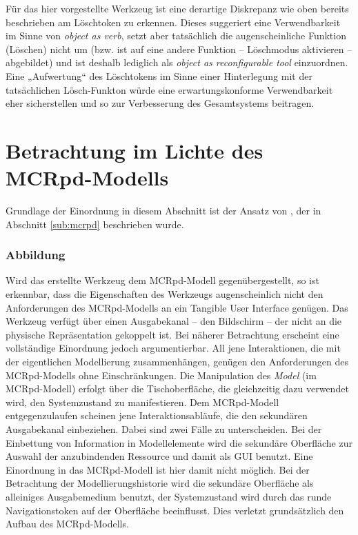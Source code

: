 Für das hier vorgestellte Werkzeug ist eine derartige Diskrepanz wie oben bereits beschrieben am Löschtoken zu erkennen. Dieses suggeriert eine Verwendbarkeit im Sinne von \emph{object as verb}, setzt aber tatsächlich die augenscheinliche Funktion (Löschen) nicht um (bzw. ist auf eine andere Funktion -- Löschmodus aktivieren -- abgebildet) und ist deshalb lediglich als \emph{object as reconfigurable tool} einzuordnen. Eine „Aufwertung“ des Löschtokens im Sinne einer Hinterlegung mit der tatsächlichen Lösch-Funkton würde eine erwartungskonforme Verwendbarkeit eher sicherstellen und so zur Verbesserung des Gesamtsystems beitragen.


\section{Betrachtung im Lichte des MCRpd-Modells} %
\label{sec:betrachtung_im_lichte_des_mcrpd_modells}

Grundlage der Einordnung in diesem Abschnitt ist der Ansatz von \citet{Ullmer00}, der in Abschnitt \ref{sub:mcrpd} beschrieben wurde.

\subsubsection{Abbildung}

Wird das erstellte Werkzeug dem \gls{MCRpd}-Modell gegenübergestellt, so ist erkennbar, dass die Eigenschaften des Werkzeugs augenscheinlich nicht den Anforderungen des \gls{MCRpd}-Modells an ein Tangible User Interface genügen. Das Werkzeug verfügt über einen Ausgabekanal -- den Bildschirm -- der nicht an die physische Repräsentation gekoppelt ist. Bei näherer Betrachtung erscheint eine vollständige Einordnung jedoch argumentierbar. All jene Interaktionen, die mit der eigentlichen Modellierung zusammenhängen, genügen den Anforderungen des \gls{MCRpd}-Modells ohne Einschränkungen. Die Manipulation des \emph{Model} (im \gls{MCRpd}-Modell) erfolgt über die Tischoberfläche, die gleichzeitig dazu verwendet wird, den Systemzustand zu manifestieren. Dem \gls{MCRpd}-Modell entgegenzulaufen scheinen jene Interaktionsabläufe, die den sekundären Ausgabekanal einbeziehen. Dabei sind zwei Fälle zu unterscheiden. Bei der Einbettung von Information in Modellelemente wird die sekundäre Oberfläche zur Auswahl der anzubindenden Ressource und damit als \gls{GUI} benutzt. Eine Einordnung in das \gls{MCRpd}-Modell ist hier damit nicht möglich. Bei der Betrachtung der Modellierungshistorie wird die sekundäre Oberfläche als alleiniges Ausgabemedium benutzt, der Systemzustand wird durch das runde Navigationstoken auf der Oberfläche beeinflusst. Dies verletzt grundsätzlich den Aufbau des MCRpd-Modells.

